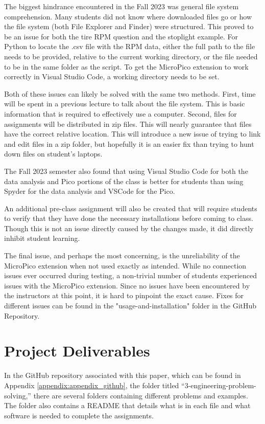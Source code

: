 The biggest hindrance encountered in the Fall 2023 was general file system comprehension. Many students did not 
know where downloaded files go or how the file system (both File Explorer and Finder) were structured. This proved 
to be an issue for both the tire RPM question and the stoplight example. For Python to locate the .csv file 
with the RPM data, either the full path to the file needs to be provided, relative to the current working directory,
or the file needed to be in the same folder as the script. To get the MicroPico extension to work correctly in
Visual Studio Code, a working directory needs to be set. 

Both of these issues can likely be solved with the same two methods. First, time will be spent in a previous lecture
to talk about the file system. This is basic information that is required to effectively use a computer. Second,
files for assignments will be distributed in zip files. This will nearly guarantee that files have the correct
relative location. This will introduce a new issue of trying to link and edit files in a zip folder, but hopefully
it is an easier fix than trying to hunt down files on student's laptops.

The Fall 2023 semester also found that using Visual Studio Code for both the data analysis and Pico portions of the
class is better for students than using Spyder for the data analysis and VSCode for the Pico. 

An additional pre-class assignment will also be created that will require students to verify that they have
done the necessary installations before coming to class. Though this is not an issue directly caused by the changes
made, it did directly inhibit student learning.

The final issue, and perhaps the most concerning, is the unreliability of the MicroPico extension when not used 
exactly as intended. While no connection issues ever occurred during testing, a non-trivial number of students
experienced issues with the MicroPico extension. Since no issues have been encountered by the instructors at this
point, it is hard to pinpoint the exact cause. Fixes for different issues can be found in the 
"usage-and-installation" folder in the GitHub Repository.

\section{Project Deliverables}

In the GitHub repository associated with this paper, which can be found in Appendix \ref{appendix:appendix_github},
the folder titled ``3-engineering-problem-solving,'' there are several folders containing different problems and 
examples. The folder also contains a README that details what is in each file and what software is needed to 
complete the assignments. 

